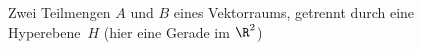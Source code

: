\begin{figure}[b]
    \caption{Zwei Teilmengen $A$ und $B$ eines Vektorraums, 
            getrennt durch eine Hyperebene~$H$ (hier eine Gerade im $\R^2$)}
    \label{vl05:fig:hyper}
\end{figure}

